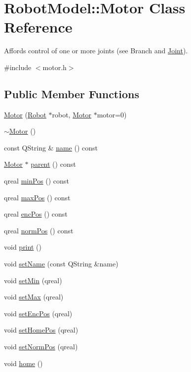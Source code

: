 \hypertarget{class_robot_model_1_1_motor}{
\section{RobotModel::Motor Class Reference}
\label{class_robot_model_1_1_motor}
}


Affords control of one or more joints (see Branch and \hyperlink{class_robot_model_1_1_joint}{Joint}).  


{\ttfamily \#include $<$motor.h$>$}\subsection*{Public Member Functions}
\begin{DoxyCompactItemize}
\item 
\hyperlink{class_robot_model_1_1_motor_afa8d3bb8b2ad45bdc8064efa0052dd04}{Motor} (\hyperlink{class_robot_model_1_1_robot}{Robot} $\ast$robot, \hyperlink{class_robot_model_1_1_motor}{Motor} $\ast$motor=0)
\item 
\hyperlink{class_robot_model_1_1_motor_a2e57c7b2681efea1d3b7f253ee88ecd4}{$\sim$Motor} ()
\item 
const QString \& \hyperlink{class_robot_model_1_1_motor_a35eeb7f97a9339ee23c0689af2463c17}{name} () const 
\item 
\hyperlink{class_robot_model_1_1_motor}{Motor} $\ast$ \hyperlink{class_robot_model_1_1_motor_a31de5801eb1a089723a7f6980baff4a2}{parent} () const 
\item 
qreal \hyperlink{class_robot_model_1_1_motor_af2cc406d7443e2cf350408d12b8e544b}{minPos} () const 
\item 
qreal \hyperlink{class_robot_model_1_1_motor_abd6baf3a9ae74dcf970663e5ee303131}{maxPos} () const 
\item 
qreal \hyperlink{class_robot_model_1_1_motor_a8f95b65d6bf72038a4aca3a394609354}{encPos} () const 
\item 
qreal \hyperlink{class_robot_model_1_1_motor_a99de4f0e475ec8bea35fa3977fa8731f}{normPos} () const 
\item 
void \hyperlink{class_robot_model_1_1_motor_a35ae467be2d96ea6acca0860e5bda22f}{print} ()
\item 
void \hyperlink{class_robot_model_1_1_motor_a9efaa43179205b53df370f7811023eb6}{setName} (const QString \&name)
\item 
void \hyperlink{class_robot_model_1_1_motor_a404e359dac5e3af43860948d9e35f725}{setMin} (qreal)
\item 
void \hyperlink{class_robot_model_1_1_motor_ad52f8d0e1aa0b5f60b388188147a1ded}{setMax} (qreal)
\item 
void \hyperlink{class_robot_model_1_1_motor_a80d5a42cb4cc119afe0bdd4ed90a4152}{setEncPos} (qreal)
\item 
void \hyperlink{class_robot_model_1_1_motor_a2467c521c141e2cc9cf21d85d56dd20b}{setHomePos} (qreal)
\item 
void \hyperlink{class_robot_model_1_1_motor_a2c26ea7475deaef6e1546edbadf88729}{setNormPos} (qreal)
\item 
void \hyperlink{class_robot_model_1_1_motor_ae8e0845a9284fbf8013137bf6b1f9293}{home} ()
\end{DoxyCompactItemize}


